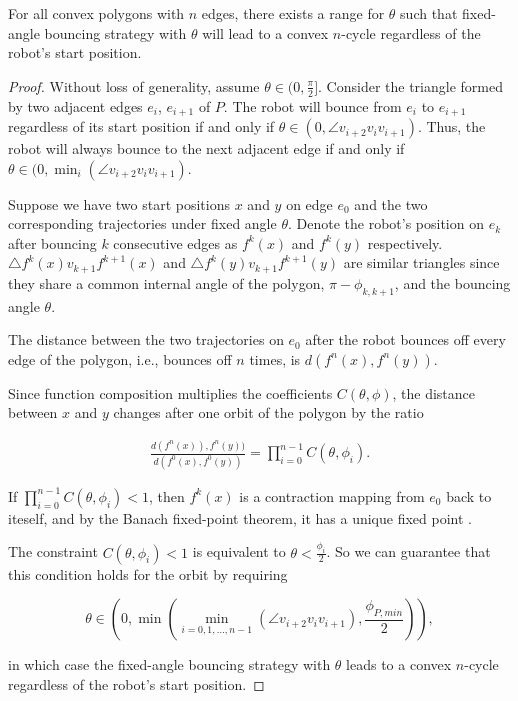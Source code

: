 \documentclass[]{svproc}  %
\begin{document}
\begin{theorem} \label{thm:convex}
For all convex polygons with $n$ edges, there exists a range for $\theta$ such that fixed-angle bouncing strategy with $\theta$ will lead to a convex $n$-cycle regardless of the robot's start position.
\end{theorem}
\begin{proof}
Without loss of generality, assume $\theta \in (0, \frac{\pi}{2}]$. Consider the
triangle formed by two adjacent edges $e_i$, $e_{i+1}$ of $P$. The robot will
bounce from $e_i$ to $e_{i+1}$ regardless of its start position if and only if
$\theta \in (0, \angle v_{i+2}v_{i}v_{i+1})$. Thus, the robot will always bounce
to the next adjacent edge if and only if
$\theta \in (0, \min_{i}(\angle v_{i+2}v_{i}v_{i+1})$.

Suppose we have two start positions $x$ and $y$ on edge $e_0$ and the two
corresponding trajectories under fixed angle $\theta$. Denote the robot's
position on $e_k$ after bouncing $k$ consecutive edges as $f^{k}(x)$ and
$f^{k}(y)$ respectively. $\triangle f^{k}(x)v_{k+1}f^{k+1}(x)$ and
$\triangle f^{k}(y)v_{k+1}f^{k+1}(y)$ are similar triangles since they share a
common internal angle of the polygon, $\pi - \phi_{k,k+1}$, and the bouncing angle
$\theta$.

The distance between the two trajectories on $e_0$ after the robot bounces off
every edge of the polygon, i.e., bounces off $n$ times, is
$d(f^{n}(x), f^{n}(y))$.

Since function composition multiplies the coefficients $C(\theta, \phi)$, 
the distance between $x$ and $y$ changes after one orbit of the polygon by the
ratio

\begin{eqnarray*}
\frac{d(f^{n}(x)), f^{n}(y))}{d(f^{0}(x), f^{0}(y))} = \prod_{i = 0}^{n-1}
C(\theta, \phi_{i}).
\end{eqnarray*}

If $\prod_{i = 0}^{n-1} C(\theta, \phi_{i}) < 1$, then $f^k(x)$ is a contraction
mapping from $e_0$ back to iteself, and by the Banach fixed-point theorem, it
has a unique fixed point \cite{Granas2003}.

The constraint $C(\theta,\phi_{i})<1$ is equivalent to
$\theta < \frac{\phi_{i}}{2}$. So we can guarantee that this condition holds
for the orbit by requiring

\begin{equation*}
\theta \in (0, \min(\min_{i = 0, 1, \dots, n-1}(\angle v_{i+2}v_{i}v_{i+1}),
\frac{\phi_{P,min}}{2})),
\end{equation*}

in which case the fixed-angle bouncing strategy with $\theta$ leads to a convex
$n$-cycle regardless of the robot's start position.
\end{proof}
\end{document}
